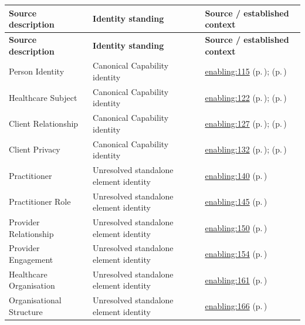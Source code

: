 \begin{longtable}{|>{\raggedright\arraybackslash}p{0.38\TableWidth}|>{\raggedright\arraybackslash}p{0.27\TableWidth}|>{\raggedright\arraybackslash}p{0.35\TableWidth}|}
\hline\rowcolor{TableHead}\textbf{Source description} & \textbf{Identity standing} & \textbf{Source / established context}\\\hline\endfirsthead
\hline\rowcolor{TableHead}\textbf{Source description} & \textbf{Identity standing} & \textbf{Source / established context}\\\hline\endhead
\hline\endfoot
Person Identity & Canonical Capability identity & \hyperref[rad:enabling:115]{enabling:115} (p.\,\pageref{rad:enabling:115}); \nameref{cap:bec-person-identity} (p.\,\pageref{cap:bec-person-identity})\\\hline
Healthcare Subject & Canonical Capability identity & \hyperref[rad:enabling:115]{enabling:122} (p.\,\pageref{rad:enabling:115}); \nameref{cap:bec-healthcare-subject} (p.\,\pageref{cap:bec-healthcare-subject})\\\hline
Client Relationship & Canonical Capability identity & \hyperref[rad:enabling:115]{enabling:127} (p.\,\pageref{rad:enabling:115}); \nameref{cap:bec-client-relationship} (p.\,\pageref{cap:bec-client-relationship})\\\hline
Client Privacy & Canonical Capability identity & \hyperref[rad:enabling:115]{enabling:132} (p.\,\pageref{rad:enabling:115}); \nameref{cap:bec-client-privacy} (p.\,\pageref{cap:bec-client-privacy})\\\hline
Practitioner & Unresolved standalone element identity & \hyperref[rad:enabling:140]{enabling:140} (p.\,\pageref{rad:enabling:140})\\\hline
Practitioner Role & Unresolved standalone element identity & \hyperref[rad:enabling:140]{enabling:145} (p.\,\pageref{rad:enabling:140})\\\hline
Provider Relationship & Unresolved standalone element identity & \hyperref[rad:enabling:140]{enabling:150} (p.\,\pageref{rad:enabling:140})\\\hline
Provider Engagement & Unresolved standalone element identity & \hyperref[rad:enabling:140]{enabling:154} (p.\,\pageref{rad:enabling:140})\\\hline
Healthcare Organisation & Unresolved standalone element identity & \hyperref[rad:enabling:161]{enabling:161} (p.\,\pageref{rad:enabling:161})\\\hline
Organisational Structure & Unresolved standalone element identity & \hyperref[rad:enabling:161]{enabling:166} (p.\,\pageref{rad:enabling:161})\\\hline

\end{longtable}
